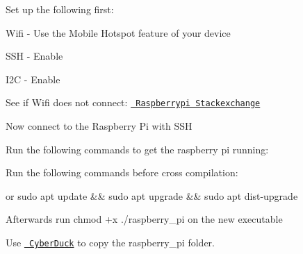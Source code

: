 Set up the following first\+:


\begin{DoxyItemize}
\item Wifi -\/ Use the Mobile Hotspot feature of your device
\item SSH -\/ Enable
\item I2C -\/ Enable
\end{DoxyItemize}

See if Wifi does not connect\+: \href{https://raspberrypi.stackexchange.com/questions/96736}{\texttt{ Raspberrypi Stackexchange}}

Now connect to the Raspberry Pi with SSH

Run the following commands to get the raspberry pi running\+: 
\begin{DoxyCode}{0}

\end{DoxyCode}


Run the following commands before cross compilation\+: 
\begin{DoxyCode}{0}

\end{DoxyCode}
 or {\ttfamily sudo apt update \&\& sudo apt upgrade \&\& sudo apt dist-\/upgrade}

Afterwards run {\ttfamily chmod +x ./raspberry\+\_\+pi} on the new executable

Use \href{https://cyberduck.io/}{\texttt{ Cyber\+Duck}} to copy the raspberry\+\_\+pi folder. 